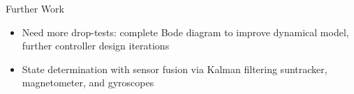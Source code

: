\documentclass[slidestop,compress]{beamer}
\begin{document}
\begin{frame}[plain]
\begin{block}{\centering Further Work}
\hspace{1 mm}
\begin{itemize}
\item Need more drop-tests: complete Bode diagram to improve dynamical model, further controller design iterations
\item State determination with sensor fusion via Kalman filtering suntracker, magnetometer, and gyroscopes
\end{itemize}
\end{block}    
\end{frame}
\end{document}
